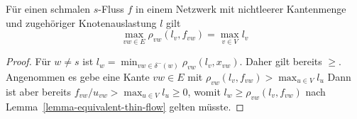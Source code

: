 \begin{corollary}\label{cor-thin-flows-max-node-label-equals-max-edge-label}
	Für einen schmalen $s$-Fluss $f$ in einem Netzwerk mit nichtleerer Kantenmenge und zugehöriger Knotenauslastung $l$ gilt
	\[
		\max_{vw\in E} \rho_{vw}(l_v, f_{vw}) = \max_{v\in V} l_v
	\]
\end{corollary}
\begin{proof}
	Für $w\neq s$ ist $l_w = \min_{vw\in\delta^-(w)} \rho_{vw}(l_v, x_{vw})$.
	Daher gilt bereits \glqq$\geq$\grqq.
	Angenommen es gebe eine Kante $vw\in E$ mit $\rho_{vw}(l_v, f_{vw}) > \max_{u\in V} l_u$
	Dann ist aber bereits $f_{vw}/u_{vw} > \max_{u\in V} l_u \geq 0$, womit $l_w \geq \rho_{vw}(l_v, f_{vw})$ nach Lemma~\ref{lemma-equivalent-thin-flow} gelten müsste.
\end{proof}

